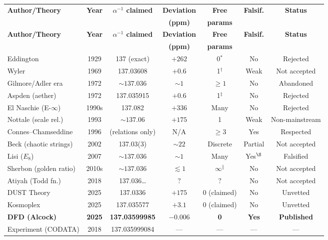 \documentclass[11pt,a4paper]{article}
\begin{document}
\begin{longtable}{p{3.5cm}cccccc}
\toprule
\textbf{Author/Theory} & \textbf{Year} & \textbf{$\alpha^{-1}$ claimed} & \textbf{Deviation} & \textbf{Free} & \textbf{Falsif.} & \textbf{Status} \\
 & & & \textbf{(ppm)} & \textbf{params} & & \\
\midrule
\endfirsthead
\toprule
\textbf{Author/Theory} & \textbf{Year} & \textbf{$\alpha^{-1}$ claimed} & \textbf{Deviation} & \textbf{Free} & \textbf{Falsif.} & \textbf{Status} \\
 & & & \textbf{(ppm)} & \textbf{params} & & \\
\midrule
\endhead
\bottomrule
\endlastfoot

Eddington & 1929 & 137 (exact) & $+262$ & 0$^*$ & No & Rejected \\
Wyler & 1969 & 137.03608 & $+0.6$ & 1$^\dagger$ & Weak & Not accepted \\
Gilmore/Adler era & 1972 & $\sim 137.036$ & $\sim 1$ & $\geq 1$ & No & Abandoned \\
Aspden (aether) & 1972 & 137.035915 & $+0.6$ & 1$^\ddagger$ & No & Rejected \\
El Naschie (E-$\infty$) & 1990s & 137.082 & $+336$ & Many & No & Rejected \\
Nottale (scale rel.) & 1993 & $\sim 137.06$ & $+175$ & 1 & Weak & Non-mainstream \\
Connes--Chamseddine & 1996 & (relations only) & N/A & $\geq 3$ & Yes & Respected \\
Beck (chaotic strings) & 2002 & 137.03(3) & $\sim 22$ & Discrete & Partial & Not accepted \\
Lisi ($E_8$) & 2007 & $\sim 137.036$ & $\sim 1$ & Many & Yes$^\S$ & Falsified \\
Sherbon (golden ratio) & 2010s & $\sim 137.036$ & $\lesssim 1$ & $\infty^\|$ & No & Not accepted \\
Atiyah (Todd fn.) & 2018 & 137.036\ldots & $?$ & $?$ & No & Not accepted \\
DUST Theory & 2025 & 137.0336 & $+175$ & 0 (claimed) & No & Unvetted \\
Kosmoplex & 2025 & 137.035577 & $+3.1$ & 0 (claimed) & No & Unvetted \\
\midrule
\rowcolor{green!10}
\textbf{DFD (Alcock)} & \textbf{2025} & \textbf{137.03599985} & $\mathbf{-0.006}$ & \textbf{0} & \textbf{Yes} & \textbf{Published} \\
\midrule
\rowcolor{yellow!10}
Experiment (CODATA) & 2018 & 137.035999084 & --- & --- & --- & --- \\
\end{longtable}
\end{document}
